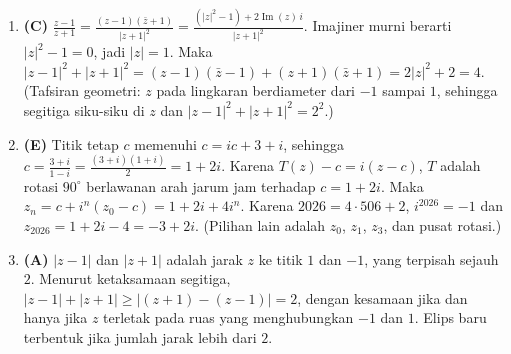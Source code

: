 \documentclass[a4paper,11pt]{article}
\newcommand{\dis}{\displaystyle}
\renewcommand{\Im}{\operatorname{Im}}
\newcounter{no}
\begin{document}
\begin{enumerate}[leftmargin=2em,itemsep=2pt,topsep=2pt]
\item[\textbf{18.}] \textbf{(C)} $\dis\frac{z-1}{z+1}=\frac{(z-1)(\bar z+1)}{|z+1|^2}=\frac{(|z|^2-1)+2\Im(z)\,i}{|z+1|^2}$. Imajiner murni berarti $|z|^2-1=0$, jadi $|z|=1$. Maka $|z-1|^2+|z+1|^2=(z-1)(\bar z-1)+(z+1)(\bar z+1)=2|z|^2+2=4$. (Tafsiran geometri: $z$ pada lingkaran berdiameter dari $-1$ sampai $1$, sehingga segitiga siku-siku di $z$ dan $|z-1|^2+|z+1|^2=2^2$.)
\item[\textbf{19.}] \textbf{(E)} Titik tetap $c$ memenuhi $c=ic+3+i$, sehingga $c=\frac{3+i}{1-i}=\frac{(3+i)(1+i)}{2}=1+2i$. Karena $T(z)-c=i(z-c)$, $T$ adalah rotasi $90^\circ$ berlawanan arah jarum jam terhadap $c=1+2i$. Maka $z_n=c+i^n(z_0-c)=1+2i+4i^n$. Karena $2026=4\cdot506+2$, $i^{2026}=-1$ dan $z_{2026}=1+2i-4=-3+2i$. (Pilihan lain adalah $z_0$, $z_1$, $z_3$, dan pusat rotasi.)
\item[\textbf{20.}] \textbf{(A)} $|z-1|$ dan $|z+1|$ adalah jarak $z$ ke titik $1$ dan $-1$, yang terpisah sejauh $2$. Menurut ketaksamaan segitiga, $|z-1|+|z+1|\ge|(z+1)-(z-1)|=2$, dengan kesamaan jika dan hanya jika $z$ terletak pada ruas yang menghubungkan $-1$ dan $1$. Elips baru terbentuk jika jumlah jarak lebih dari $2$.
\end{enumerate}
\par{}\par\vspace{0.2em}
\end{document}
